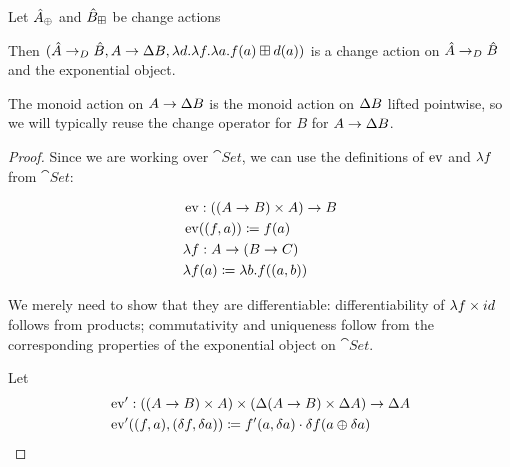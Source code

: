\begin{prop}[Exponentials]
\label{prop:exponentials}
  Let $\hat{A}_\oplus$ and $\hat{B}_\boxplus$ be change actions

  Then $(\hat{A} \rightarrow_{D} \hat{B},A
    \rightarrow \Delta B,\lambda d. \lambda f. \lambda a. f(a) \boxplus
    d(a))$ is a change action on $\hat{A} \rightarrow_{D} \hat{B}$ and the exponential object.

  The monoid action on $A \rightarrow \Delta B$ is the monoid
  action on $\Delta B$ lifted pointwise, so we will typically reuse the
  change operator for $B$ for $A \rightarrow \Delta B$.
\end{prop}
\ifproofs
\begin{proof}
  Since we are working over $\cat{Set}$, we can use the definitions of $\operatorname{ev}$ and
  $\lambda f$ from $\cat{Set}$:

  \begin{align*}
    &\operatorname{ev} : ((A \rightarrow B) \times A) \rightarrow B\\
    &\operatorname{ev}((f, a)) \coloneqq f(a)\\
    &\lambda f : A \rightarrow (B \rightarrow C)\\
    &\lambda f(a) \coloneqq \lambda b. f((a, b))\\
  \end{align*}

  We merely need to show that they are differentiable: differentiability of $\lambda f
  \times id$ follows from products; commutativity and
  uniqueness follow from the corresponding properties of the exponential object
  on $\cat{Set}$.

  Let
  \begin{align*}
    &\operatorname{ev}' : ((A \rightarrow B) \times A) \times (\Delta (A \rightarrow B) \times \Delta A) \rightarrow \Delta A\\
    &\operatorname{ev}'((f, a), (\delta f, \delta a)) \coloneqq f'(a, \delta a) \cdot \delta f(a \oplus \delta a)
  \end{align*}


\end{proof}
